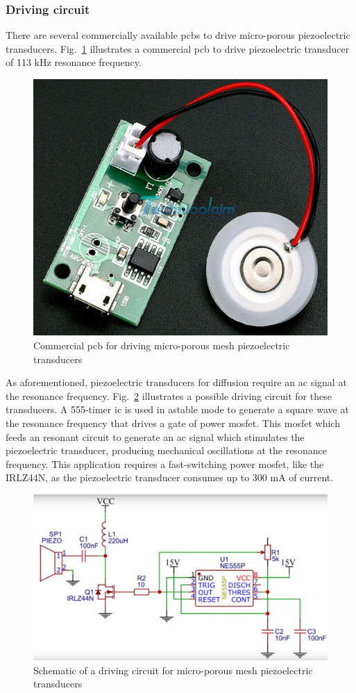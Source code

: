 \subsubsection{Driving circuit}
\label{sec:driving-circuit}
There are several commercially available \glspl{pcb} to drive micro-porous
piezoelectric transducers. Fig.~\ref{fig:pcb-diffusion} illustrates a commercial
\gls{pcb} to drive piezoelectric transducer of 113 kHz resonance frequency.
%
\begin{figure}[htb!]
\centering
    \includegraphics[width=0.4\columnwidth]{./img/pcb-diffusion.png}
  \caption{Commercial \gls{pcb} for driving micro-porous mesh piezoelectric transducers~\cite{ebayPiezo}}%
\label{fig:pcb-diffusion}
\end{figure}

As aforementioned, piezoelectric transducers for diffusion require an \gls{ac}
signal at the resonance frequency. Fig.~\ref{fig:pcb-reverse-eng} illustrates a
possible driving circuit for these transducers. A 555-timer \gls{ic} is used in
astable mode to generate a square wave at the resonance frequency that drives a
gate of power \gls{mosfet}. This \gls{mosfet} which feeds an resonant circuit to
generate an \gls{ac} signal which stimulates the piezoelectric transducer,
producing mechanical oscillations at the resonance frequency. This application
requires a fast-switching power \gls{mosfet}, like the IRLZ44N, as the
piezoelectric transducer consumes up to 300 mA of current. 
%
\begin{figure}[htb!]
\centering
    \includegraphics[width=0.6\columnwidth]{./img/pcb-reverse-eng.png}
  \caption{Schematic of a driving circuit for micro-porous mesh piezoelectric transducers~\cite{piezoSchematic}}%
\label{fig:pcb-reverse-eng}
\end{figure}



